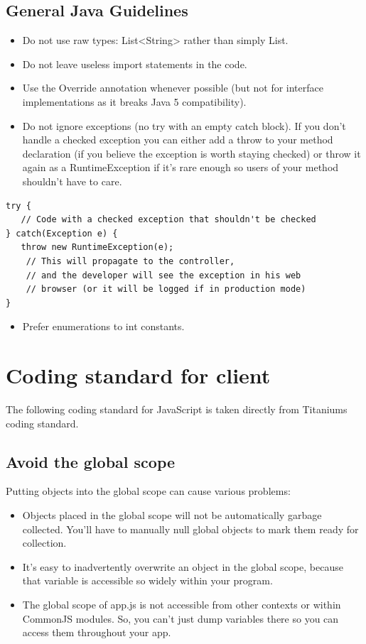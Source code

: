\documentclass[11pt]{book}
\begin{document}
\subsection{General Java Guidelines}
\begin{itemize}
    \item Do not use raw types: List<String> rather than simply List.
    \item Do not leave useless import statements in the code.
    \item Use the Override annotation whenever possible (but not for interface implementations as it breaks Java 5 compatibility).
    \item Do not ignore exceptions (no try with an empty catch block). If you don't handle a checked exception you can either add a throw to your method declaration (if you believe the exception is worth staying checked) or throw it again as a RuntimeException if it's rare enough so users of your method shouldn't have to care.
\end{itemize}
\begin{lstlisting}[frame=single]
try {
   // Code with a checked exception that shouldn't be checked
} catch(Exception e) {
   throw new RuntimeException(e);
    // This will propagate to the controller,
    // and the developer will see the exception in his web
    // browser (or it will be logged if in production mode)
}
\end{lstlisting}
\begin{itemize}
    \item Prefer enumerations to int constants.
\end{itemize}

\section{Coding standard for client}
The following coding standard for JavaScript is taken directly from Titaniums coding standard\cite{titaniumCodingStandard}.

\subsection{Avoid the global scope}
Putting objects into the global scope can cause various problems:
\begin{itemize}
    \item Objects placed in the global scope will not be automatically garbage collected. You'll have to manually null global objects to mark them ready for collection.
    \item It's easy to inadvertently overwrite an object in the global scope, because that variable is accessible so widely within your program.
    \item The global scope of app.js is not accessible from other contexts or within CommonJS modules. So, you can't just dump variables there so you can access them throughout your app.
\end{itemize}
\end{document}
